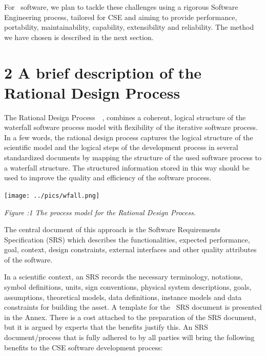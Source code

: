 \documentclass{article}
\begin{document}
For \nep \   software, we plan to tackle these challenges using a rigorous Software 
Engineering process, tailored for CSE and aiming to provide performance, portability, 
maintainability, capability, extensibility and reliability. The method we have 
chosen is described in the next section.

\section*{{\Large{}{ \textbf{2 A brief description of the Rational 
Design Process}}}}

The Rational Design Process~\cite{ref [4]}~\cite{ref [5]}, combines a coherent, logical structure of 
the waterfall software process model with flexibility of the iterative software 
process. In a few words, the rational design process captures the logical structure 
of the scientific model and the logical steps of the development process in several 
standardized documents by mapping the structure of the used software process to 
a waterfall structure. The structured information stored in this way should be 
used to improve the quality and efficiency of the software process.

\begin{center}
\texttt{[image: ../pics/wfall.png]}

{ \textit{Figure :1 The process model for the Rational Design Process.}}
\end{center}

\baselineskip=18pt
The central document of this approach is the Software Requirements Specification 
(SRS) which describes the functionalities, expected performance, goal, context, 
design constraints, external interfaces and other quality attributes of the software.

In a scientific context, an SRS records the necessary terminology, notations, symbol 
definitions, units, sign conventions, physical system descriptions, goals, assumptions, 
theoretical models, data definitions, instance models and data constraints for 
building the asset. A template for the \nep \   SRS document is presented in the 
Annex. There is a cost attached to the preparation of the SRS document, but it 
is argued by experts that the benefits justify this. An SRS document/process that 
is fully adhered to by all parties will bring the following benefits to the CSE 
software development process: 
\end{document}
